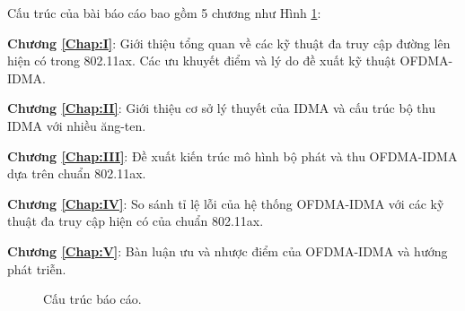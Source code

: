 Cấu trúc của bài báo cáo bao gồm 5 chương như Hình \ref{fig:Struc}:

\textbf{Chương \ref{Chap:I}}: Giới thiệu tổng quan về các kỹ thuật đa truy cập đường lên hiện có trong 802.11ax. Các ưu khuyết điểm và lý do đề xuất kỹ thuật OFDMA-IDMA.

\textbf{Chương \ref{Chap:II}}: Giới thiệu cơ sở lý thuyết của IDMA và cấu trúc bộ thu IDMA với nhiều ăng-ten.

\textbf{Chương \ref{Chap:III}}: Đề xuất kiến trúc mô hình bộ phát và thu OFDMA-IDMA dựa trên chuẩn 802.11ax.

\textbf{Chương \ref{Chap:IV}}: So sánh tỉ lệ lỗi của hệ thống OFDMA-IDMA với các kỹ thuật đa truy cập hiện có của chuẩn 802.11ax.

\textbf{Chương \ref{Chap:V}}: Bàn luận ưu và nhược điểm của OFDMA-IDMA và hướng phát triễn.

\begin{figure}[H]
	\centering
	
	\caption{Cấu trúc báo cáo.}
	\label{fig:Struc}
\end{figure}
